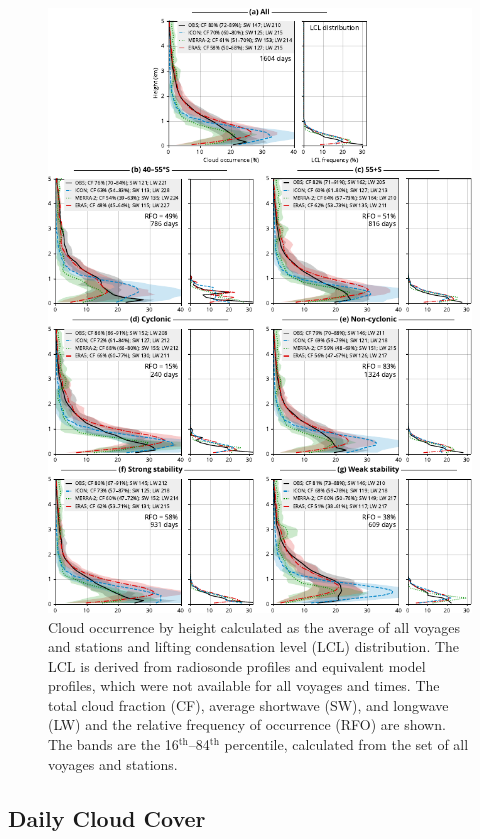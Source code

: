 \documentclass[draft]{agujournal2019}
\begin{document}
\begin{figure}[p!]
\centering
\includegraphics[width=\textwidth]{img/cl_agg_rev1.pdf}
\caption{
Cloud occurrence by height calculated as the average of all voyages and stations and lifting condensation level (LCL) distribution. The LCL is derived from radiosonde profiles and equivalent model profiles, which were not available for all voyages and times. The total cloud fraction (CF), average shortwave (SW), and longwave (LW) and the relative frequency of occurrence (RFO) are shown. The bands are the 16$^\mathrm{th}$--84$^\mathrm{th}$ percentile, calculated from the set of all voyages and stations.
}
\label{fig:cloud-occurrence}
\end{figure}

\subsection{Daily Cloud Cover}
\label{sec:cloud-cover}
\end{document}

